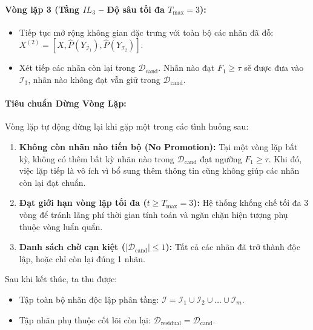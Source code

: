 \documentclass[11pt,a4paper]{article}
\begin{document}
\paragraph{Vòng lặp 3 (Tầng $IL_3$ -- Độ sâu tối đa $T_{\max} = 3$):}
\begin{itemize}
    \item Tiếp tục mở rộng không gian đặc trưng với toàn bộ các nhãn đã đỗ: $X^{(2)} = [X, \hat{P}(Y_{\mathcal{I}_1}), \hat{P}(Y_{\mathcal{I}_2})]$.
    \item Xét tiếp các nhãn còn lại trong $\mathcal{D}_{\text{cand}}$. Nhãn nào đạt $F_1 \ge \tau$ sẽ được đưa vào $\mathcal{I}_3$, nhãn nào không đạt vẫn giữ trong $\mathcal{D}_{\text{cand}}$.
\end{itemize}

\paragraph{Tiêu chuẩn Dừng Vòng Lặp:}
Vòng lặp tự động dừng lại khi gặp một trong các tình huống sau:
\begin{enumerate}
    \item \textbf{Không còn nhãn nào tiến bộ (No Promotion):} Tại một vòng lặp bất kỳ, không có thêm bất kỳ nhãn nào trong $\mathcal{D}_{\text{cand}}$ đạt ngưỡng $F_1 \ge \tau$. Khi đó, việc lặp tiếp là vô ích vì bổ sung thêm thông tin cũng không giúp các nhãn còn lại đạt chuẩn.
    \item \textbf{Đạt giới hạn vòng lặp tối đa ($t \ge T_{\max} = 3$):} Hệ thống khống chế tối đa 3 vòng để tránh lãng phí thời gian tính toán và ngăn chặn hiện tượng phụ thuộc vòng luẩn quẩn.
    \item \textbf{Danh sách chờ cạn kiệt ($|\mathcal{D}_{\text{cand}}| \le 1$):} Tất cả các nhãn đã trở thành độc lập, hoặc chỉ còn lại đúng 1 nhãn.
\end{enumerate}

Sau khi kết thúc, ta thu được:
\begin{itemize}
    \item Tập toàn bộ nhãn độc lập phân tầng: $\mathcal{I} = \mathcal{I}_1 \cup \mathcal{I}_2 \cup \dots \cup \mathcal{I}_m$.
    \item Tập nhãn phụ thuộc cốt lõi còn lại: $\mathcal{D}_{\text{residual}} = \mathcal{D}_{\text{cand}}$.
\end{itemize}
\end{document}

